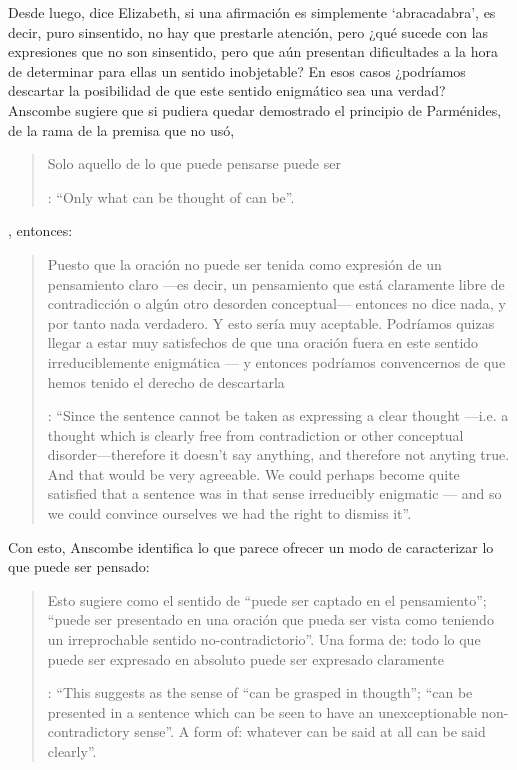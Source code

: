 Desde luego, dice Elizabeth, si una afirmación es simplemente `abracadabra', es decir, puro sinsentido, no hay que prestarle atención, pero ¿qué sucede con las expresiones que no son sinsentido, pero que aún presentan dificultades a la hora de determinar para ellas un sentido inobjetable? En esos casos ¿podríamos descartar la posibilidad de que este sentido enigmático sea una verdad? Anscombe sugiere que si pudiera quedar demostrado el principio de Parménides, de la rama de la premisa que no usó, \blockquote[{\Cite[6]{anscombe1981parmenides:pmc}}: \enquote{Only what can be thought of can be}.]{Solo aquello de lo que puede pensarse puede ser}, entonces: \blockquote[{\Cite[8]{anscombe1981parmenides:pmc}}: \enquote{Since the sentence cannot be taken as expressing a clear thought ---i.e. a thought which is clearly free from contradiction or other conceptual disorder---therefore it doesn't say anything, and therefore not anyting true. And that would be very agreeable. We could perhaps become quite satisfied that a sentence was in that sense irreducibly enigmatic --- and so we could convince ourselves we had the right to dismiss it}.]{Puesto que la oración no puede ser tenida como expresión de un pensamiento claro ---es decir, un pensamiento que está claramente libre de contradicción o algún otro desorden conceptual--- entonces no dice nada, y por tanto nada verdadero. Y esto sería muy aceptable. Podríamos quizas llegar a estar muy satisfechos de que una oración fuera en este sentido irreduciblemente enigmática --- y entonces podríamos convencernos de que hemos tenido el derecho de descartarla}.

Con esto, Anscombe identifica lo que parece ofrecer un modo de caracterizar lo que puede ser pensado: \blockquote[{\Cite[8]{anscombe1981parmenides:pmc}}: \enquote{This suggests as the sense of ``can be grasped in thougth''; ``can be presented in a sentence which can be seen to have an unexceptionable non-contradictory sense''. A form of: whatever can be said at all can be said clearly}.]{Esto sugiere como el sentido de ``puede ser captado en el pensamiento''; ``puede ser presentado en una oración que pueda ser vista como teniendo un irreprochable sentido no-contradictorio''. Una forma de: todo lo que puede ser expresado en absoluto puede ser expresado claramente}.

